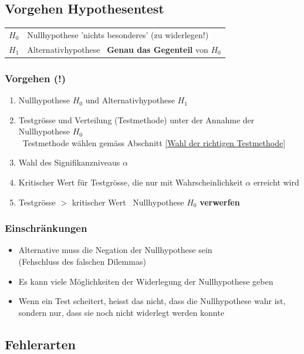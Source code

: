 \subsection{Vorgehen Hypothesentest}

\begin{tabular}{ll}
	$H_0$	& Nullhypothese 'nichts besonderes' (zu widerlegen!)							\\
	$H_1$ 	& Alternativhypothese \textrightarrow\ \textbf{Genau das Gegenteil} von $H_0$
\end{tabular}


\subsubsection{Vorgehen (!)}

\begin{enumerate}
	\item Nullhypothese $H_0$ und Alternativhypothese $H_1$ 
	\item Testgrösse und Verteilung (Testmethode) unter der Annahme der Nullhypothese $H_0$ \\
		\textrightarrow\ Testmethode wählen gemäss Abschnitt \ref{Wahl der richtigen Testmethode}
	\item Wahl des Signifikanzniveaus $\alpha$
	\item Kritischer Wert für Testgrösse, die nur mit Wahrscheinlichkeit $\alpha$ erreicht wird 
	\item Testgrösse $>$ kritischer Wert \textrightarrow\ Nullhypothese $H_0$ \textbf{verwerfen}
\end{enumerate}


\subsubsection{Einschränkungen}

\begin{itemize}
	\item Alternative muss die Negation der Nullhypothese sein \\
		(Fehschluss des falschen Dilemmas)
	\item Es kann viele Möglichkeiten der Widerlegung der Nullhypothese geben
	\item Wenn ein Test scheitert, heisst das nicht, dass die Nullhypothese wahr ist, sondern nur, dass sie noch nicht widerlegt werden konnte 
\end{itemize}


\subsection{Fehlerarten}

